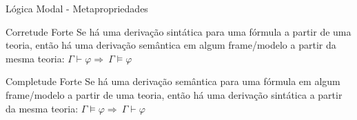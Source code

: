 \documentclass[xcolor=table]{beamer}
\renewcommand \phi{\varphi}
\newcommand{\miguel}[1]{\textcolor{violet}{\textbf{MIGUEL:} #1}}
\begin{document}
    \begin{frame}{Lógica Modal - Metapropriedades}

        \begin{block}{Corretude Forte}
            Se há uma derivação sintática para uma fórmula a partir de uma teoria, então há uma derivação semântica em algum frame/modelo a partir da mesma teoria:
            \(\Gamma \vdash \phi \Rightarrow \ \Gamma \vDash \phi\)
        \end{block}

        \vspace{2\baselineskip}


        \begin{block}{Completude Forte}
            Se há uma derivação semântica para uma fórmula em algum frame/modelo a partir de uma teoria, então há uma derivação sintática a partir da mesma teoria:
            \(\Gamma \vDash \phi \Rightarrow \ \Gamma \vdash \phi\)
        \end{block}
    \end{frame}
\end{document}
